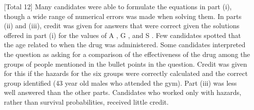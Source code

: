 \documentclass[a4paper,12pt]{article}
\begin{document}
[Total 12]
Many candidates were able to formulate the equations in part (i),
though a wide range of numerical errors was made when solving them.
In parts (ii) and (iii), credit was given for answers that were correct
given the solutions offered in part (i) for the values of \beta A , \beta G , and \beta S .
Few candidates spotted that the age related to when the drug was
administered. Some candidates interpreted the question as asking for a
comparison of the effectiveness of the drug among the groups of people
mentioned in the bullet points in the question. Credit was given for this
if the hazards for the six groups were correctly calculated and the
correct group identified (43 year old males who attended the gym).
Part (iii) was less well answered than the other parts. Candidates who
worked only with hazards, rather than survival probabilities, received
little credit.
\end{document}
